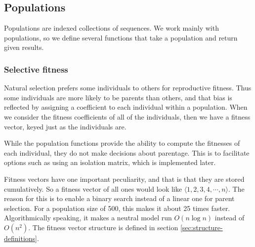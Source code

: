 \documentclass{article}
\begin{document}

    \subsection{Populations}
      \label{sec:populations}

      Populations are indexed collections of sequences. We work mainly with
      populations, so we define several functions that take a population and
      return given results.

      \subsubsection{Selective fitness}

	Natural selection prefers some individuals to others for reproductive
	fitness.  Thus some individuals are more likely to be parents than
	others, and that bias is reflected by assigning a coefficient to each
	individual within a population.  When we consider the fitness
	coefficients of all of the individuals, then we have a fitness vector,
	keyed just as the individuals are.

	While the population functions provide the ability to compute the
	fitnesses of each individual, they do not make decisions about
	parentage.  This is to facilitate options such as using an isolation
	matrix, which is implemented later.

	Fitness vectors have one important peculiarity, and that is that they
	are stored cumulatively. So a fitness vector of all ones would look like
	$\langle 1, 2, 3, 4, \cdots, n \rangle$. The reason for this is to
	enable a binary search instead of a linear one for parent selection. For
	a population size of 500, this makes it about 25 times faster.
	Algorithmically speaking, it makes a neutral model run $O(n \log n)$
	instead of $O(n^2)$. The fitness vector structure is defined in section
	\ref{sec:structure-definitions}.
\end{document}

